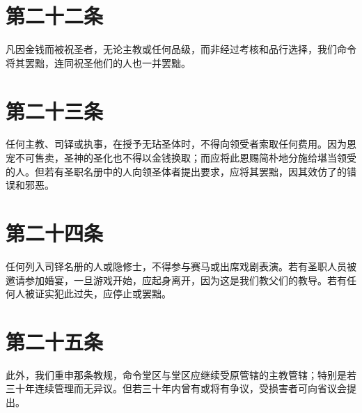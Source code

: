 
\section{第二十二条}

凡因金钱而被祝圣者，无论主教或任何品级，而非经过考核和品行选择，我们命令将其罢黜，连同祝圣他们的人也一并罢黜。\par


\section{第二十三条}

任何主教、司铎或执事，在授予无玷圣体时，不得向领受者索取任何费用。因为恩宠不可售卖，圣神的圣化也不得以金钱换取；而应将此恩赐简朴地分施给堪当领受的人。但若有圣职名册中的人向领圣体者提出要求，应将其罢黜，因其效仿了的错误和邪恶。\par


\section{第二十四条}

任何列入司铎名册的人或隐修士，不得参与赛马或出席戏剧表演。若有圣职人员被邀请参加婚宴，一旦游戏开始，应起身离开，因为这是我们教父们的教导。若有任何人被证实犯此过失，应停止或罢黜。\par


\section{第二十五条}

此外，我们重申那条教规，命令堂区与堂区应继续受原管辖的主教管辖；特别是若三十年连续管理而无异议。但若三十年内曾有或将有争议，受损害者可向省议会提出。\par


